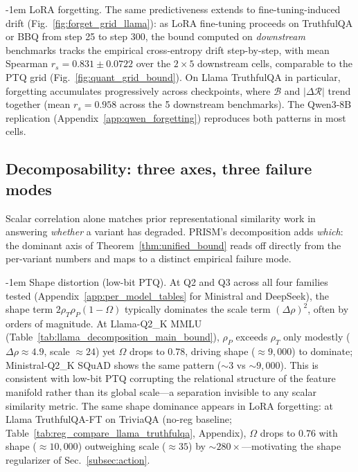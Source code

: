 \documentclass{article} %
\makeatletter
\newlength{\paraSpace}
\renewcommand{\paragraph}{\@startsection{paragraph}{4}{\z@}%
  {\paraSpace}{-1em}%
  {\normalfont\normalsize\bfseries}}
\makeatother
\begin{document}
\paragraph{LoRA forgetting.}
The same predictiveness extends to fine-tuning-induced drift (Fig.~\ref{fig:forget_grid_llama}): as LoRA fine-tuning proceeds on TruthfulQA or BBQ from step 25 to step 300, the bound computed on \emph{downstream} benchmarks tracks the empirical cross-entropy drift step-by-step, with mean Spearman $r_s=0.831 \pm 0.0722$ over the $2 \times 5$ downstream cells, comparable to the PTQ grid (Fig.~\ref{fig:quant_grid_bound}). On Llama TruthfulQA in particular, forgetting accumulates progressively across checkpoints, where $\mathcal{B}$ and $|\Delta\mathcal{R}|$ trend together (mean $r_s = 0.958$ across the 5 downstream benchmarks). The Qwen3-8B replication (Appendix~\ref{app:qwen_forgetting}) reproduces both patterns in most cells.


\subsection{Decomposability: three axes, three failure modes}
\label{subsec:decompose}

Scalar correlation alone matches prior representational similarity work in answering \emph{whether} a variant has degraded. PRISM's decomposition adds \emph{which}: the dominant axis of Theorem~\ref{thm:unified_bound} reads off directly from the per-variant numbers and maps to a distinct empirical failure mode.

\paragraph{Shape distortion (low-bit PTQ).}
At Q2 and Q3 across all four families tested (Appendix~\ref{app:per_model_tables} for Ministral and DeepSeek), the shape term $2\rho_T\rho_P(1{-}\Omega)$ typically dominates the scale term $(\Delta\rho)^2$, often by orders of magnitude. At Llama-Q2\_K MMLU (Table~\ref{tab:llama_decomposition_main_bound}), $\rho_P$ exceeds $\rho_T$ only modestly ($\Delta\rho \approx 4.9$, scale $\approx 24$) yet $\Omega$ drops to $0.78$, driving shape ($\approx 9{,}000$) to dominate; Ministral-Q2\_K SQuAD shows the same pattern ($\sim 3$ vs $\sim 9{,}000$). This is consistent with low-bit PTQ corrupting the relational structure of the feature manifold rather than its global scale---a separation invisible to any scalar similarity metric. The same shape dominance appears in LoRA forgetting: at Llama TruthfulQA-FT on TriviaQA (no-reg baseline; Table~\ref{tab:reg_compare_llama_truthfulqa}, Appendix), $\Omega$ drops to $0.76$ with shape ($\approx 10{,}000$) outweighing scale ($\approx 35$) by ${\sim}280\times$---motivating the shape regularizer of Sec.~\ref{subsec:action}.
\end{document}
